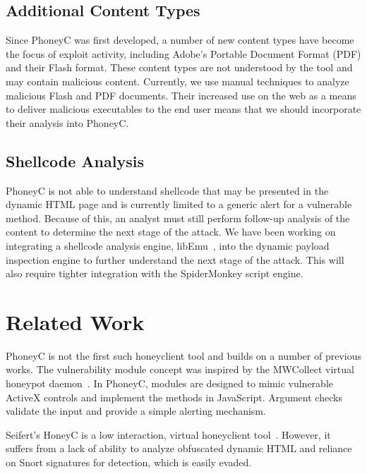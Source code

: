 \documentclass[10pt,twocolumn]{article}
\begin{document}
\subsection{Additional Content Types}
\label{add-content}

Since PhoneyC was first developed, a number of new content types have become the focus of exploit activity, including Adobe's Portable Document Format (PDF) and their Flash format. These content types are not understood by the tool and may contain malicious content. Currently, we use manual techniques to analyze malicious Flash and PDF documents. Their increased use on the web as a means to deliver malicious executables to the end user means that we should incorporate their analysis into PhoneyC.

\subsection{Shellcode Analysis}
\label{shellcode}

PhoneyC is not able to understand shellcode that may be presented in the dynamic HTML page and is currently limited to a generic alert for a vulnerable method. Because of this, an analyst must still perform follow-up analysis of the content to determine the next stage of the attack. We have been working on integrating a shellcode analysis engine, libEmu~\cite{libemu}, into the dynamic payload inspection engine to further understand the next stage of the attack. This will also require tighter integration with the SpiderMonkey script engine. 

\section{Related Work}
\label{related-work}

PhoneyC is not the first such honeyclient tool and builds on a number of previous works. The vulnerability module concept was inspired by the MWCollect virtual honeypot daemon~\cite{freiling2005bte}. In PhoneyC, modules are designed to mimic vulnerable ActiveX controls and implement the methods in JavaScript. Argument checks validate the input and provide a simple alerting mechanism. 

Seifert's HoneyC is a low interaction, virtual honeyclient tool~\cite{seifert2006hli}. However, it suffers from a lack of ability to analyze obfuscated dynamic HTML and reliance on Snort signatures for detection, which is easily evaded.
\end{document}
